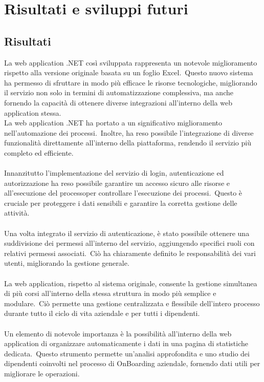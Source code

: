 \chapter{Risultati e sviluppi futuri}\label{chapter:Risultati_e_sviluppi_futuri}
%
\section{Risultati}\label{sec:cap_sec_subsec}
%
La web application .NET così sviluppata rappresenta un notevole miglioramento rispetto alla versione 
originale basata su un foglio Excel.\ Questo nuovo sistema ha permesso di sfruttare in modo più efficace 
le risorse tecnologiche, migliorando il servizio non solo in termini di automatizzazione complessiva, 
ma anche fornendo la capacità di ottenere diverse integrazioni all'interno della web application stessa.
\\
La web application .NET ha portato a un significativo miglioramento 
nell'automazione dei processi.\ Inoltre, ha reso possibile l'integrazione di diverse funzionalità direttamente 
all'interno della piattaforma, rendendo il servizio più completo ed efficiente.
\\ \\
Innanzitutto l'implementazione del servizio di login, autenticazione ed autorizzazione ha reso possibile 
garantire un accesso sicuro alle risorse e all'esecuzione del processoper controllare l'esecuzione dei processi.\ 
Questo è cruciale per proteggere i dati sensibili e garantire la corretta gestione delle attività.
\\ \\
Una volta integrato il servizio di autenticazione, è stato possibile ottenere una suddivisione dei permessi 
all'interno del servizio, aggiungendo specifici ruoli con relativi permessi associati.\ Ciò ha chiaramente 
definito le responsabilità dei vari utenti, migliorando la gestione generale.
\\ \\
La web application, rispetto al sistema originale, consente la gestione simultanea di più corsi all'interno 
della stessa struttura in modo più semplice e modulare.\ Ciò permette una gestione centralizzata e flessibile 
dell'intero processo durante tutto il ciclo di vita aziendale e per tutti i dipendenti.
\\ \\
Un elemento di notevole importanza è la possibilità all'interno della web application di organizzare automaticamente 
i dati in una pagina di statistiche dedicata.\ Questo strumento permette un'analisi approfondita e uno studio dei 
dipendenti coinvolti nel processo di OnBoarding aziendale, fornendo dati utili per migliorare le operazioni.

